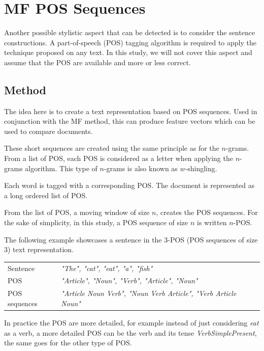 \section{MF POS Sequences \label{sec:pos_sequences}}

Another possible stylistic aspect that can be detected is to consider the sentence constructions.
A part-of-speech (POS) tagging algorithm is required to apply the technique proposed on any text.
In this study, we will not cover this aspect and assume that the POS are available and more or less correct.

\subsection{Method}

The idea here is to create a text representation based on POS sequences.
Used in conjunction with the MF method, this can produce feature vectors which can be used to compare documents.

These short sequences are created using the same principle as for the $n$-grams.
From a list of POS, each POS is considered as a letter when applying the $n$-grams algorithm.
This type of $n$-grams is also known as $w$-shingling.

\begin{definition}
  Each word is tagged with a corresponding POS.
  The document is represented as a long ordered list of POS.

  From the list of POS, a moving window of size $n$, creates the POS sequences.
  For the sake of simplicity, in this study, a POS sequence of size $n$ is written $n$-POS.

  The following example showcases a sentence in the 3-POS (POS sequences of size 3) text representation.

  \vspace{0.2cm}

  \begin{tabular}{l p{5cm}}
      \toprule
      Sentence & \textit{"The", "cat", "eat", "a", "fish"} \\
      POS & \textit{"Article", "Noun", "Verb", "Article", "Noun"} \\
      \midrule
      POS sequences & \textit{"Article Noun Verb", "Noun Verb Article", "Verb Article Noun"} \\
      \bottomrule
  \end{tabular}

  \vspace{0.2cm}

  In practice the POS are more detailed, for example instead of just considering \textit{eat} as a verb, a more detailed POS can be the verb and its tense \textit{VerbSimplePresent}, the same goes for the other type of POS.
\end{definition}

